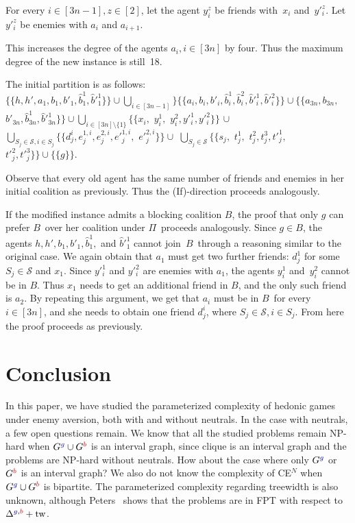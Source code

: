 \documentclass[a4paper,fleqn]{cas-sc}
\newcommand{\friendshipColor}{blue}
\newcommand{\enemyColor}{red}
\newcommand{\partition}{\ensuremath{\Pi}\xspace}
\newcommand{\blockingCoalition}{\ensuremath{B}\xspace}
\newcommand{\friendSuperscript}{{\color{\friendshipColor}g}}
\newcommand{\enemySuperscript}{{\color{\enemyColor}b}}
\newcommand{\friendshipGraph}{\ensuremath{G^{\friendSuperscript}}\xspace}
\newcommand{\enemyGraph}{\ensuremath{G^{\enemySuperscript}}\xspace}
\newcommand{\neut}[1]{#1\unskip$^{N}$}
\newcommand{\maxDegree}{\ensuremath{\Delta}}
\newcommand{\maxDegreeFE}{\ensuremath{\maxDegree^{\friendSuperscript,\enemySuperscript}}\xspace}
\newcommand{\treewidth}{\ensuremath{\text{tw}}}
\newcommand{\enemyav}{enemy aversion}
\newcommand{\sets}{\ensuremath{\mathcal{S}}}
\newcommand{\elements}{\ensuremath{[3n]}}
\newcommand{\sset}[1]{\ensuremath{S_{#1}}}
\begin{document}
{For every $i \in [3n - 1], z \in [2]$, let the agent $y^z_i$ be friends with~$x_i$ and~$y'^z_i$.
Let~$y'^z_i$ be enemies with $a_i$ and $a_{i + 1}$.

This increases the degree of the agents $a_i, i \in \elements$ by four. Thus the maximum degree of the new instance is still~18.


The initial partition is as follows: $\{\{h, h', a_1, b_1, b'_1, \hat{b}^1_1, \hat{b}'^1_1\}\} \cup \bigcup_{i \in [3n - 1]} \} \{\{a_i, b_i, b'_i, \hat{b}^1_i,  \hat{b}^2_i,  \hat{b}'^1_i, \hat{b}'^2_i\}\} \cup \{ \{a_{3n}, b_{3n},$ $b'_{3n}, \hat{b}^1_{3n},   \hat{b}'^1_{3n}\} \}\cup \bigcup_{i \in \elements \setminus \{1\}} \{\{x_i,$ $ y^1_i,$ $y^2_i, y'^1_i, y'^2_i\}\}$ $\cup$ $\bigcup_{\sset j \in \sets, i \in \sset j} \{\{d^i_j, e^{1,i}_j, e^{2,i}_j, e'^{1,i}_j,$ $e'^{2,i}_j\}\} \cup$ $\bigcup_{\sset j \in \sets} \{\{s_j,$ $t^1_j,$ $t^2_j, t^3_j, t'^1_j,$ $t'^2_j, t'^3_j\}\} \cup \{\{g\}\}$.

Observe that every old agent has the same number of friends and enemies in her initial coalition as previously.
Thus the (If)-direction proceeds analogously.

If the modified instance admits a blocking coalition \blockingCoalition, the proof that only $g$ can prefer \blockingCoalition\ over her coalition under \partition\ proceeds analogously.
Since $g \in \blockingCoalition$, the agents $h, h', b_1, b'_1, \hat{b}^1_1,$ and $ \hat{b}'^1_1$ cannot join~\blockingCoalition\ through a reasoning similar to the original case.
We again obtain that $a_1$ must get two further friends: $d^1_j$ for some $\sset j \in \sets$ and $x_1$.
Since $y'^1_i$ and $y'^2_i$ are enemies with $a_1$, the agents $y^1_i$ and~$y^2_i$ cannot be in \blockingCoalition. Thus $x_1$ needs to get an additional friend in \blockingCoalition, and the only such friend is $a_{2}$.
By repeating this argument, we get that $a_i$ must be in \blockingCoalition\ for every $i \in \elements$, and she needs to obtain one friend $d^i_j$, where $\sset j \in \sets, i \in \sset j$.
From here the proof proceeds as previously.}

\section{Conclusion}
In this paper, we have studied the parameterized complexity of hedonic games under \enemyav, both with and without neutrals.
In the case with neutrals, a few open questions remain.
We know that all the studied problems remain NP-hard when $\friendshipGraph \cup \enemyGraph$ is an interval graph, since clique is an interval graph and the problems are NP-hard without neutrals.
How about the case where only $\friendshipGraph$ or $\enemyGraph$ is an interval graph? 
We also do not know the complexity of \neut{CE} when $\friendshipGraph \cup \enemyGraph$ is bipartite.
The parameterized complexity regarding treewidth is also unknown, although Peters~\cite{peters2016graphical} shows that the problems are in FPT with respect to $\maxDegreeFE + \treewidth$.
\label{sec:conclusion}
\end{document}
